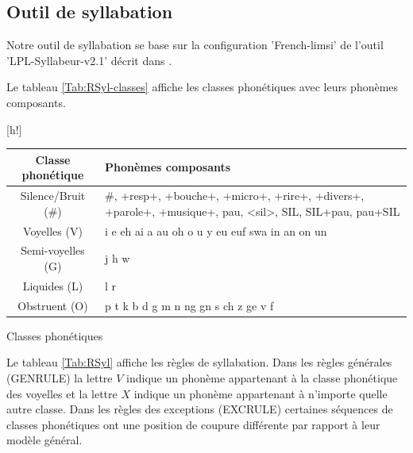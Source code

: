 \documentclass{style/these}
\makeatletter
\renewcommand\familydefault{ptm}
\newenvironment{aTable}%
  {%
   \renewcommand{\familydefault}{lmtt}\selectfont
  \@float{table}}
  {\end@float}
\let\oldcite=\cite
\renewcommand{\cite}[1]{{\fontfamily{qcs}\selectfont{\color{darkerblue}[\oldcite{#1}]}}}
\makeatother
\begin{document}
\begin{part}

\clearpage
\newpage

\chapter{Outil de syllabation}
\label{Ann:Syllabation}
\renewcommand{\rightmark}{Outil de syllabation}
\renewcommand{\leftmark}{Annexe C}

Notre outil de syllabation se base sur la configuration 'French-limsi' de l'outil 'LPL-Syllabeur-v2.1' décrit dans \cite{Bigi:2010}.

Le tableau \ref{Tab:RSyl-classes} affiche les classes phonétiques avec leurs phonèmes composants.

\begin{aTable}[h!]
\centering
\begin{tabular}{|c|p{9cm}|}
\hline
\textbf{Classe phonétique} & \textbf{Phonèmes composants}										\\ \hline
Silence/Bruit (\#) 	& \#, +resp+, +bouche+, +micro+, +rire+, +divers+, +parole+, +musique+, pau, <sil>, SIL, SIL+pau, pau+SIL	\\ \hline
Voyelles (V) 		& i e eh ai a au oh o u y eu euf swa in an on un 								\\ \hline
Semi-voyelles (G)	& j h w														\\ \hline
Liquides (L)		& l r														\\ \hline	
Obstruent (O)		& p t k b d g m n ng gn s ch z ge v f 										\\ \hline
\end{tabular}
\caption{Classes phonétiques}
\label{Tab:RSyl-classes}
\end{aTable}

Le tableau \ref{Tab:RSyl} affiche les règles de syllabation. 
Dans les règles générales (GENRULE) la lettre $V$ indique un phonème appartenant à la classe phonétique des voyelles et la lettre $X$ indique un phonème appartenant à n'importe quelle autre classe. Dans les règles des exceptions (EXCRULE) certaines séquences de classes phonétiques ont une position de coupure différente par rapport à leur modèle général. 


\end{part}
\end{document}
